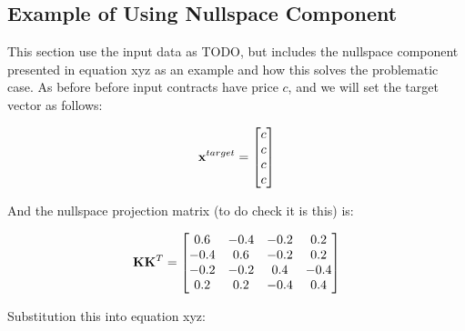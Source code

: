 \documentclass{article}
\begin{document}

\subsection{Example of Using Nullspace Component}
This section use the input data as TODO, but includes the nullspace component presented
in equation xyz as an example and how this solves the problematic case. As before
before input contracts have price $c$, and we will set the target vector as follows:

\begin{equation}
    \mathbf{x}^{target} = \begin{bmatrix}
        c \\
        c \\
        c \\
        c \\
    \end{bmatrix}
\end{equation}

And the nullspace projection matrix (to do check it is this) is:

\begin{equation}
    \mathbf{K} \mathbf{K}^T = \begin{bmatrix}
        0.6 & -0.4 & -0.2 & 0.2  \\
        -0.4 & 0.6 & -0.2 & 0.2 \\
        -0.2 & -0.2 & 0.4 & -0.4 \\
        0.2 & 0.2 & -0.4 & 0.4
    \end{bmatrix}
\end{equation}

Substitution this into equation xyz:
\end{document}
